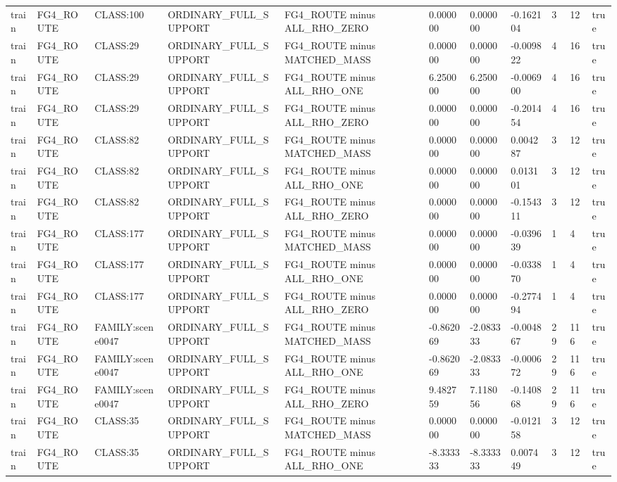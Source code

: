 \begin{tabular}{lllllllllll}
train & FG4\_ROUTE & CLASS:100 & ORDINARY\_FULL\_SUPPORT & FG4\_ROUTE minus ALL\_RHO\_ZERO & 0.000000 & 0.000000 & -0.162104 & 3 & 12 & true \\
train & FG4\_ROUTE & CLASS:29 & ORDINARY\_FULL\_SUPPORT & FG4\_ROUTE minus MATCHED\_MASS & 0.000000 & 0.000000 & -0.009822 & 4 & 16 & true \\
train & FG4\_ROUTE & CLASS:29 & ORDINARY\_FULL\_SUPPORT & FG4\_ROUTE minus ALL\_RHO\_ONE & 6.250000 & 6.250000 & -0.006900 & 4 & 16 & true \\
train & FG4\_ROUTE & CLASS:29 & ORDINARY\_FULL\_SUPPORT & FG4\_ROUTE minus ALL\_RHO\_ZERO & 0.000000 & 0.000000 & -0.201454 & 4 & 16 & true \\
train & FG4\_ROUTE & CLASS:82 & ORDINARY\_FULL\_SUPPORT & FG4\_ROUTE minus MATCHED\_MASS & 0.000000 & 0.000000 & 0.004287 & 3 & 12 & true \\
train & FG4\_ROUTE & CLASS:82 & ORDINARY\_FULL\_SUPPORT & FG4\_ROUTE minus ALL\_RHO\_ONE & 0.000000 & 0.000000 & 0.013101 & 3 & 12 & true \\
train & FG4\_ROUTE & CLASS:82 & ORDINARY\_FULL\_SUPPORT & FG4\_ROUTE minus ALL\_RHO\_ZERO & 0.000000 & 0.000000 & -0.154311 & 3 & 12 & true \\
train & FG4\_ROUTE & CLASS:177 & ORDINARY\_FULL\_SUPPORT & FG4\_ROUTE minus MATCHED\_MASS & 0.000000 & 0.000000 & -0.039639 & 1 & 4 & true \\
train & FG4\_ROUTE & CLASS:177 & ORDINARY\_FULL\_SUPPORT & FG4\_ROUTE minus ALL\_RHO\_ONE & 0.000000 & 0.000000 & -0.033870 & 1 & 4 & true \\
train & FG4\_ROUTE & CLASS:177 & ORDINARY\_FULL\_SUPPORT & FG4\_ROUTE minus ALL\_RHO\_ZERO & 0.000000 & 0.000000 & -0.277494 & 1 & 4 & true \\
train & FG4\_ROUTE & FAMILY:scene0047 & ORDINARY\_FULL\_SUPPORT & FG4\_ROUTE minus MATCHED\_MASS & -0.862069 & -2.083333 & -0.004867 & 29 & 116 & true \\
train & FG4\_ROUTE & FAMILY:scene0047 & ORDINARY\_FULL\_SUPPORT & FG4\_ROUTE minus ALL\_RHO\_ONE & -0.862069 & -2.083333 & -0.000672 & 29 & 116 & true \\
train & FG4\_ROUTE & FAMILY:scene0047 & ORDINARY\_FULL\_SUPPORT & FG4\_ROUTE minus ALL\_RHO\_ZERO & 9.482759 & 7.118056 & -0.140868 & 29 & 116 & true \\
train & FG4\_ROUTE & CLASS:35 & ORDINARY\_FULL\_SUPPORT & FG4\_ROUTE minus MATCHED\_MASS & 0.000000 & 0.000000 & -0.012158 & 3 & 12 & true \\
train & FG4\_ROUTE & CLASS:35 & ORDINARY\_FULL\_SUPPORT & FG4\_ROUTE minus ALL\_RHO\_ONE & -8.333333 & -8.333333 & 0.007449 & 3 & 12 & true \\

\end{tabular}
